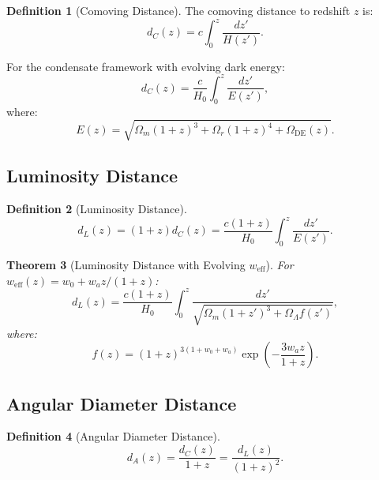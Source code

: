\documentclass[11pt,a4paper]{article}
\newcommand{\weff}{\ensuremath{w_{\mathrm{eff}}}}
\newcommand{\OmegaLam}{\ensuremath{\Omega_\Lambda}}
\newcommand{\OmegaM}{\ensuremath{\Omega_m}}
\newtheorem{theorem}{Theorem}[section]
\theoremstyle{definition}
\newtheorem{definition}[theorem]{Definition}
\theoremstyle{remark}
\begin{document}
\begin{definition}[Comoving Distance]
The comoving distance to redshift $z$ is:
\begin{equation}
\label{eq:d_C}
d_C(z) = c\int_0^z \frac{dz'}{H(z')}.
\end{equation}
\end{definition}

For the condensate framework with evolving dark energy:
\begin{equation}
\label{eq:d_C_condensate}
d_C(z) = \frac{c}{H_0}\int_0^z \frac{dz'}{E(z')},
\end{equation}
where:
\begin{equation}
E(z) = \sqrt{\OmegaM(1+z)^3 + \Omega_r(1+z)^4 + \Omega_{\mathrm{DE}}(z)}.
\end{equation}

\subsection{Luminosity Distance}
\label{sec:luminosity_distance}

\begin{definition}[Luminosity Distance]
\begin{equation}
\label{eq:d_L}
\boxed{d_L(z) = (1+z)d_C(z) = \frac{c(1+z)}{H_0}\int_0^z \frac{dz'}{E(z')}.}
\end{equation}
\end{definition}

\begin{theorem}[Luminosity Distance with Evolving $\weff$]
\label{thm:d_L_weff}
For $\weff(z) = w_0 + w_a z/(1+z)$:
\begin{equation}
\label{eq:d_L_weff}
d_L(z) = \frac{c(1+z)}{H_0}\int_0^z \frac{dz'}{\sqrt{\OmegaM(1+z')^3 + \OmegaLam f(z')}},
\end{equation}
where:
\begin{equation}
f(z) = (1+z)^{3(1+w_0+w_a)}\exp\left(-\frac{3w_a z}{1+z}\right).
\end{equation}
\end{theorem}

\subsection{Angular Diameter Distance}
\label{sec:angular_distance}

\begin{definition}[Angular Diameter Distance]
\begin{equation}
\label{eq:d_A}
\boxed{d_A(z) = \frac{d_C(z)}{1+z} = \frac{d_L(z)}{(1+z)^2}.}
\end{equation}
\end{definition}
\end{document}
